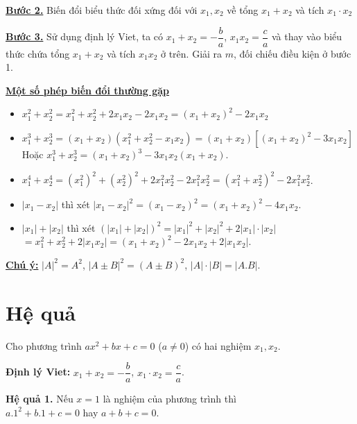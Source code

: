 \documentclass[12pt,a4paper]{extarticle}
\begin{document}
\noindent\underline{\textbf{Bước 2.}} Biến đổi biểu thức đối xứng đối với $x_1, x_2$ về tổng $x_1 + x_2$ và tích $x_1 \cdot x_2$

\noindent\underline{\textbf{Bước 3.}} Sử dụng định lý Viet, ta có $x_1 + x_2 = -\dfrac{b}{a}$, $x_1x_2 = \dfrac{c}{a}$ và thay vào biểu thức chứa tổng $x_1 + x_2$ và tích $x_1x_2$ ở trên. Giải ra $m$, đối chiếu điều kiện ở bước 1.

\noindent\underline{\textbf{{Một số phép biến đổi thường gặp}}}
\begin{itemize}
    \item $x_1^2 + x_2^2 = x_1^2 + x_2^2 + 2x_1x_2 - 2x_1x_2 = (x_1 + x_2)^2 - 2x_1x_2$
    \item $x_1^3 + x_2^3 = (x_1 + x_2)(x_1^2 + x_2^2 - x_1x_2) = (x_1 + x_2)\left[(x_1 + x_2)^2 - 3x_1x_2\right]$ \\
    Hoặc $x_1^3 + x_2^3 = (x_1 + x_2)^3 - 3x_1x_2(x_1 + x_2)$.
    \item $x_1^4 + x_2^4 = \left(x_1^2\right)^2 + \left(x_2^2\right)^2 + 2x_1^2x_2^2 - 2x_1^2x_2^2 = \left(x_1^2 + x_2^2\right)^2 - 2x_1^2x_2^2$.
    \item $|x_1 - x_2|$ thì xét $|x_1 - x_2|^2 = (x_1 - x_2)^2 = (x_1 + x_2)^2 - 4x_1x_2$.
    \item $|x_1| + |x_2|$ thì xét $\left(|x_1| + |x_2|\right)^2 = |x_1|^2 + |x_2|^2 + 2|x_1| \cdot |x_2|$ \\
    $= x_1^2 + x_2^2 + 2|x_1x_2| = (x_1 + x_2)^2 - 2x_1x_2 + 2|x_1x_2|$.
\end{itemize}

\noindent\underline{\textbf{Chú ý:}} $|A|^2 = A^2$, $|A \pm B|^2 = (A \pm B)^2$, $|A| \cdot |B| = |A.B|$.
\section{Hệ quả}

\vspace{0.5em}

\noindent Cho phương trình $ax^2 + bx + c = 0$ ($a \neq 0$) có hai nghiệm $x_1, x_2$.

\vspace{0.5em}
\noindent\textbf{Định lý Viet:} $x_1 + x_2 = -\dfrac{b}{a}$, $x_1 \cdot x_2 = \dfrac{c}{a}$.

\vspace{0.8em}
\noindent\textbf{{Hệ quả 1.}} Nếu $x = 1$ là nghiệm của phương trình thì \\
\indent $a.1^2 + b.1 + c = 0$ hay $a + b + c = 0$.
\end{document}
